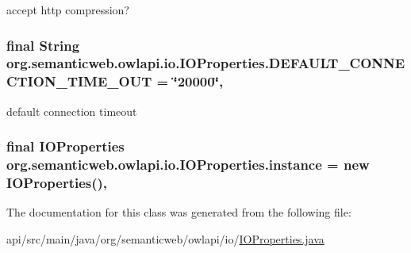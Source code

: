 accept http compression? \hypertarget{classorg_1_1semanticweb_1_1owlapi_1_1io_1_1_i_o_properties_a10aabfa15c14cf7d47f889082b49b723}{
\subsubsection[{D\-E\-F\-A\-U\-L\-T\-\_\-\-C\-O\-N\-N\-E\-C\-T\-I\-O\-N\-\_\-\-T\-I\-M\-E\-\_\-\-O\-U\-T}]{\setlength{\rightskip}{0pt plus 5cm}final String org.\-semanticweb.\-owlapi.\-io.\-I\-O\-Properties.\-D\-E\-F\-A\-U\-L\-T\-\_\-\-C\-O\-N\-N\-E\-C\-T\-I\-O\-N\-\_\-\-T\-I\-M\-E\-\_\-\-O\-U\-T = \char`\"{}20000\char`\"{}\hspace{0.3cm}{\ttfamily [static]}, {\ttfamily [private]}}}\label{classorg_1_1semanticweb_1_1owlapi_1_1io_1_1_i_o_properties_a10aabfa15c14cf7d47f889082b49b723}
default connection timeout \hypertarget{classorg_1_1semanticweb_1_1owlapi_1_1io_1_1_i_o_properties_ad356ff53c7d5d87cfc950afd7b01859c}{
\subsubsection[{instance}]{\setlength{\rightskip}{0pt plus 5cm}final {\bf I\-O\-Properties} org.\-semanticweb.\-owlapi.\-io.\-I\-O\-Properties.\-instance = new {\bf I\-O\-Properties}()\hspace{0.3cm}{\ttfamily [static]}, {\ttfamily [private]}}}\label{classorg_1_1semanticweb_1_1owlapi_1_1io_1_1_i_o_properties_ad356ff53c7d5d87cfc950afd7b01859c}


The documentation for this class was generated from the following file\-:\begin{DoxyCompactItemize}
\item 
api/src/main/java/org/semanticweb/owlapi/io/\hyperlink{_i_o_properties_8java}{I\-O\-Properties.\-java}\end{DoxyCompactItemize}

